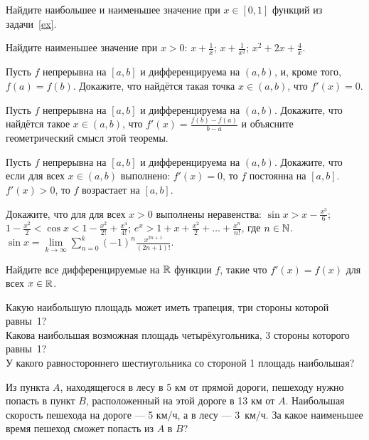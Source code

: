 \documentclass[a4paper, 12pt]{article}
\begin{document}
 Найдите наибольшее и наименьшее значение при $x\in [0,1]$ функций
из задачи~\ref{ex}.



 Найдите наименьшее значение %
при $x>0$:
 $x+\frac{1}{x}$;
 $x+\frac{1}{x^2}$;
 $x^2+2x+\frac{4}{x}$.

Пусть $f$ непрерывна на $[a,b]$  и дифференцируема на $(a,b)$,
и, кроме того, $f(a)=f(b)$. Докажите, что найд\"ется такая точка $x\in
(a,b)$, что $f'(x)=0$.

  
Пусть $f$ непрерывна на $[a,b]$  и дифференцируема на $(a,b)$.
Докажите, что найд\"ется такое $x\in (a,b)$, что
$f'(x)=\frac{f(b)-f(a)}{b-a}$ и
объясните геометрический смысл этой теоремы. %

Пусть $f$ непрерывна на $[a,b]$  и дифференцируема на $(a,b)$.
Докажите, что если для всех $x\in (a,b)$ выполнено:
 $f'(x)=0$, то $f$ постоянна
на $[a,b]$.
 $f'(x)>0$,
то $f$ возрастает на $[a,b]$.

 Докажите, что для для всех $x>0$ выполнены неравенства:
 $\sin x>x-\frac{x^3}{6}$;\\
 $1-\frac{x^2}{2}<\cos x<1-\frac{x^2}{2!}+\frac{x^4}{4!}$;
 $e^x>1+x+\frac{x^2}{2}+\ldots +\frac{x^n}{n!}$, где $n\in \mathbb{N}$.
 $\sin x = \lim\limits_{k \to \infty} \sum\limits_{n=0}^k (-1)^n \frac{x^{2n+1}}{(2n+1)!}$.

 Найдите все дифференцируемые на $\mathbb{R}$ функции $f$, такие что
$f'(x)=f(x)$ для всех $x\in \mathbb{R}$.

\vspace*{-1mm}

\vspace*{-2mm}
 Какую наибольшую площадь может иметь трапеция,
три стороны которой равны~1?\\
 Какова наибольшая возможная площадь %
четыр\"ехугольника, 3 стороны которого равны~1?\\
 У какого равностороннего шестиугольника со стороной 1 %
площадь наибольшая?

Из пункта $A$, находящегося в лесу в 5 км от прямой
дороги, пешеходу нужно попасть в пункт $B$, расположенный
на  этой дороге в 13 км от $A$.
Наибольшая скорость пешехода на дороге --- 5 км/ч, а в лесу --- 3~км/ч.
За какое наименьшее время пешеход сможет попасть из $A$ в $B$?
\end{document}
